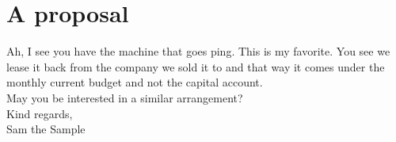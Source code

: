 \documentclass[fontsize=12pt,a4paper]{article}
\begin{document}
\section*{A proposal}

Ah, I see you have the machine that goes ping. This is my favorite. You see we lease it back from the company we sold it to and that way it comes under the monthly current budget and not the capital account. \\

May you be interested in a similar arrangement? \\

Kind regards, \\
Sam the Sample
\end{document}
